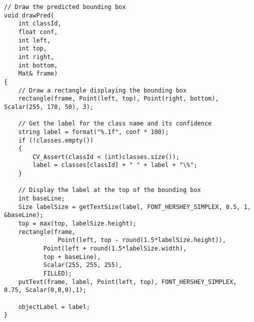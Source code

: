 \begin{verbatim}
// Draw the predicted bounding box
void drawPred(
	int classId,
	float conf,
	int left,
	int top,
	int right,
	int bottom,
	Mat& frame)
{
    // Draw a rectangle displaying the bounding box
    rectangle(frame, Point(left, top), Point(right, bottom), Scalar(255, 178, 50), 3);

    // Get the label for the class name and its confidence
    string label = format("%.1f", conf * 100);
    if (!classes.empty())
    {
        CV_Assert(classId < (int)classes.size());
        label = classes[classId] + " " + label + "\%";
    }

    // Display the label at the top of the bounding box
    int baseLine;
    Size labelSize = getTextSize(label, FONT_HERSHEY_SIMPLEX, 0.5, 1, &baseLine);
    top = max(top, labelSize.height);
    rectangle(frame,
    		   Point(left, top - round(1.5*labelSize.height)),
		   Point(left + round(1.5*labelSize.width),
		   top + baseLine),
		   Scalar(255, 255, 255),
		   FILLED);
    putText(frame, label, Point(left, top), FONT_HERSHEY_SIMPLEX, 0.75, Scalar(0,0,0),1);

    objectLabel = label;
}
\end{verbatim}

